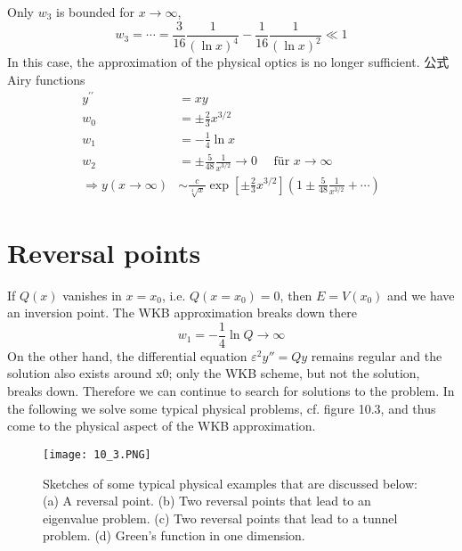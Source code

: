 Only $w_3$ is bounded for $x\rightarrow\infty$,
\begin{equation}
    w_{3}=\cdots=\frac{3}{16} \frac{1}{(\ln x)^{4}}-\frac{1}{16} \frac{1}{(\ln x)^{2}} \ll 1
    \end{equation}
In this case, the approximation of the physical optics is no longer sufficient.
公式
Airy functions
\begin{align} y^{\prime \prime} &=x y \\ w_{0} &=\pm \frac{2}{3} x^{3 / 2}\nonumber\\ w_{1} &=-\frac{1}{4} \ln x \nonumber\\ w_{2} &=\pm \frac{5}{48} \frac{1}{x^{3 / 2}} \rightarrow 0 \quad \text { für } x \rightarrow \infty \\ \Rightarrow y(x \rightarrow \infty) & \sim \frac{c}{\sqrt[4]{x}} \exp \left[\pm \frac{2}{3} x^{3 / 2}\right]\left(1 \pm \frac{5}{48} \frac{1}{x^{3 / 2}}+\cdots\right) \end{align}

\section{Reversal points}
If $Q (x)$ vanishes in $x = x_0$, i.e. $Q (x = x_0) = 0$, then $E = V (x_0)$ and we have an inversion point. The WKB approximation breaks down there
\begin{equation}
    w_1=-\frac{1}{4}\operatorname{ln}Q\rightarrow\infty
\end{equation}
On the other hand, the differential equation $\varepsilon^2y'' = Qy$ remains regular and the solution also exists around x0; only the WKB scheme, but not the solution, breaks down. Therefore we can continue to search for solutions to the problem. In the following we solve some typical physical problems, cf. figure 10.3, and thus come to the physical aspect of the WKB approximation.
\begin{figure}[ht]
        \centering
        \texttt{[image: 10\_3.PNG]}
        \caption{Sketches of some typical physical examples that are discussed below: (a) A reversal point. (b) Two reversal points that lead to an eigenvalue problem. (c) Two reversal points that lead to a tunnel problem. (d) Green's function in one dimension.}
\end{figure}
